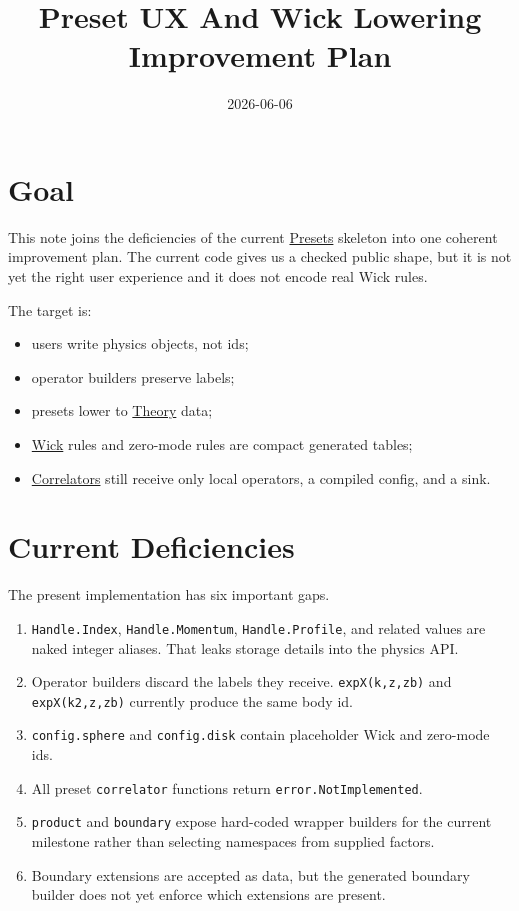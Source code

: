 \documentclass[11pt]{article}
\date{2026-06-06}
\title{Preset UX And Wick Lowering Improvement Plan}
\begin{document}
\maketitle
\tableofcontents

\section{Goal}
\label{sec:org71835f3}

This note joins the deficiencies of the current \href{../org/cft-code/presets/presets.org}{Presets} skeleton into one
coherent improvement plan.  The current code gives us a checked public shape,
but it is not yet the right user experience and it does not encode real Wick
rules.

The target is:

\begin{itemize}
\item users write physics objects, not ids;
\item operator builders preserve labels;
\item presets lower to \href{../org/cft-code/theory/theory.org}{Theory} data;
\item \href{../org/cft-code/correlators/wick.org}{Wick} rules and zero-mode rules are compact generated tables;
\item \href{../org/cft-code/correlators/correlators.org}{Correlators} still receive only local operators, a compiled config, and a
sink.
\end{itemize}
\section{Current Deficiencies}
\label{sec:orge1366ab}

The present implementation has six important gaps.

\begin{enumerate}
\item \texttt{Handle.Index}, \texttt{Handle.Momentum}, \texttt{Handle.Profile}, and related values are
naked integer aliases.  That leaks storage details into the physics API.
\item Operator builders discard the labels they receive.  \texttt{expX(k,z,zb)} and
\texttt{expX(k2,z,zb)} currently produce the same body id.
\item \texttt{config.sphere} and \texttt{config.disk} contain placeholder Wick and zero-mode ids.
\item All preset \texttt{correlator} functions return \texttt{error.NotImplemented}.
\item \texttt{product} and \texttt{boundary} expose hard-coded wrapper builders for the current
milestone rather than selecting namespaces from supplied factors.
\item Boundary extensions are accepted as data, but the generated boundary builder
does not yet enforce which extensions are present.
\end{enumerate}
\end{document}
